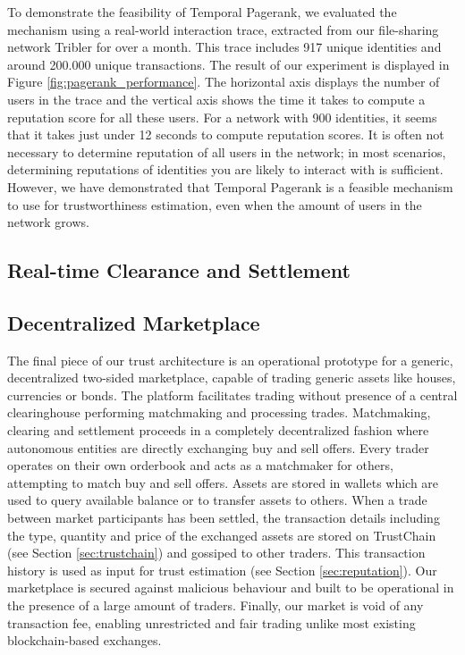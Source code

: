 \documentclass[USenglish]{article}
\begin{document}
To demonstrate the feasibility of Temporal Pagerank, we evaluated the mechanism using a real-world interaction trace, extracted from our file-sharing network Tribler for over a month.
This trace includes 917 unique identities and around 200.000 unique transactions.
The result of our experiment is displayed in Figure \ref{fig:pagerank_performance}.
The horizontal axis displays the number of users in the trace and the vertical axis shows the time it takes to compute a reputation score for all these users.
For a network with 900 identities, it seems that it takes just under 12 seconds to compute reputation scores.
It is often not necessary to determine reputation of all users in the network; in most scenarios, determining reputations of identities you are likely to interact with is sufficient.
However, we have demonstrated that Temporal Pagerank is a feasible mechanism to use for trustworthiness estimation, even when the amount of users in the network grows.

\subsection{Real-time Clearance and Settlement}
\label{sec:internet_of_money}

\subsection{Decentralized Marketplace}

The final piece of our trust architecture is an operational prototype for a generic, decentralized two-sided marketplace, capable of trading generic assets like houses, currencies or bonds.
The platform facilitates trading without presence of a central clearinghouse performing matchmaking and processing trades.
Matchmaking, clearing and settlement proceeds in a completely decentralized fashion where autonomous entities are directly exchanging buy and sell offers.
Every trader operates on their own orderbook and acts as a matchmaker for others, attempting to match buy and sell offers.
Assets are stored in wallets which are used to query available balance or to transfer assets to others.
When a trade between market participants has been settled, the transaction details including the type, quantity and price of the exchanged assets are stored on TrustChain (see Section \ref{sec:trustchain}) and gossiped to other traders.
This transaction history is used as input for trust estimation (see Section \ref{sec:reputation}).
Our marketplace is secured against malicious behaviour and built to be operational in the presence of a large amount of traders.
Finally, our market is void of any transaction fee, enabling unrestricted and fair trading unlike most existing blockchain-based exchanges.
\end{document}
